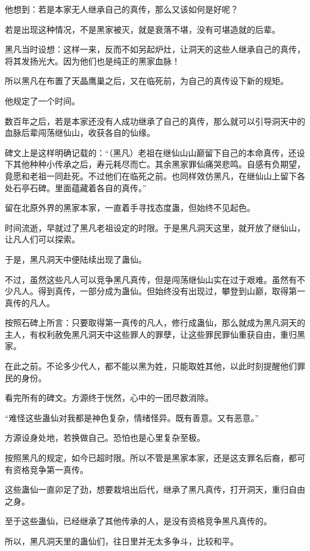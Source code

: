 \begin{this_body}
他想到：若是本家无人继承自己的真传，那么又该如何是好呢？

若是出现这种情况，不是黑家被灭，就是衰落不堪，没有可堪造就的后辈。

黑凡当时设想：这样一来，反而不如另起炉灶，让洞天的这些人继承自己的真传，将其发扬光大。因为他们也是纯正的黑家血脉！

所以黑凡在布置了天晶鹰巢之后，又在临死前，为自己的真传设下新的规矩。

他规定了一个时间。

数百年之后，若是本家还没有人成功继承了自己的真传，那么就可以引导洞天中的血脉后辈闯荡继仙山，收获各自的仙缘。

碑文上是这样明确记载的：“（黑凡）老祖在继仙山山巅留下自己的本命真传，还设下其他种种小传承之后，寿元耗尽而亡。其余黑家罪仙痛哭悲鸣。自感有负期望，竟愿和老祖一同赴死。不过他们在临死之前。也同样效仿黑凡，在继仙山上留下各处石亭石碑。里面蕴藏着各自的真传。”

留在北原外界的黑家本家，一直着手寻找态度蛊，但始终不见起色。

时间流逝，早就过了黑凡老祖设定的时限。于是黑凡洞天这里，就开放了继仙山，让凡人们可以探索。

于是，黑凡洞天中便陆续出现了蛊仙。

不过，虽然这些凡人可以竞争黑凡真传，但是闯荡继仙山实在过于艰难。虽然有不少凡人。得到真传，一部分成为蛊仙。但始终没有出现过，攀登到山巅，取得第一真传的凡人。

按照石碑上所言：只要取得第一真传的凡人，修行成蛊仙，那么就成为黑凡洞天的主人，有权利赦免黑凡洞天中这些罪人的罪孽，让这些罪民罪仙重获自由，重归黑家。

在此之前。不论多少代人，都不能以黑为姓，只能取姓其他，以此时刻提醒他们罪民的身份。

看完所有的碑文。方源终于恍然，心中的一团尽数消除。

“难怪这些蛊仙对我都是神色复杂，情绪怪异。既有善意。又有恶意。”

方源设身处地，若换做自己。恐怕也是心里复杂至极。

按照黑凡的规定，如今已超时限。所以不管是黑家本家，还是这支罪名后裔，都可有资格竞争第一真传。

这些蛊仙一直卯足了劲，想要栽培出后代，继承了黑凡真传，打开洞天，重归自由之身。

至于这些蛊仙，已经继承了其他传承的人，是没有资格竞争黑凡真传的。

所以，黑凡洞天里的蛊仙们，往日里并无太多争斗，比较和平。


\end{this_body}
